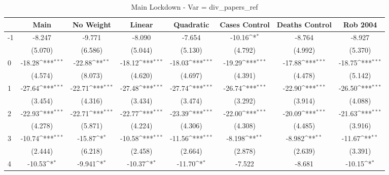 \documentclass{article}
\begin{document}
{
\def\sym#1{\ifmmode^{#1}\else\(^{#1}\)\fi}
\begin{longtable}{l*{7}{c}}
\caption{Main Lockdown - Var = div\_papers\_ref}\\
\hline\hline\endfirsthead\hline\endhead\hline\endfoot\endlastfoot
                &\multicolumn{1}{c}{Main}&\multicolumn{1}{c}{No Weight}&\multicolumn{1}{c}{Linear}&\multicolumn{1}{c}{Quadratic}&\multicolumn{1}{c}{Cases Control}&\multicolumn{1}{c}{Deaths Control}&\multicolumn{1}{c}{Rob 2004}\\
\hline
-1              &   -8.247         &   -9.771         &   -8.090         &   -7.654         &   -10.16\sym{*}  &   -8.764         &   -8.927         \\
                &  (5.070)         &  (6.586)         &  (5.044)         &  (5.130)         &  (4.792)         &  (4.992)         &  (5.370)         \\
0               &   -18.28\sym{***}&   -22.88\sym{**} &   -18.12\sym{***}&   -18.03\sym{***}&   -19.29\sym{***}&   -17.88\sym{***}&   -18.75\sym{***}\\
                &  (4.574)         &  (8.073)         &  (4.620)         &  (4.697)         &  (4.391)         &  (4.478)         &  (5.142)         \\
1               &   -27.64\sym{***}&   -22.71\sym{***}&   -27.48\sym{***}&   -27.74\sym{***}&   -26.74\sym{***}&   -22.90\sym{***}&   -26.50\sym{***}\\
                &  (3.454)         &  (4.316)         &  (3.434)         &  (3.474)         &  (3.292)         &  (3.914)         &  (4.088)         \\
2               &   -22.93\sym{***}&   -22.71\sym{***}&   -22.77\sym{***}&   -23.39\sym{***}&   -22.00\sym{***}&   -20.09\sym{***}&   -21.63\sym{***}\\
                &  (4.278)         &  (5.871)         &  (4.224)         &  (4.306)         &  (4.308)         &  (4.485)         &  (3.916)         \\
3               &   -10.74\sym{***}&   -15.87\sym{*}  &   -10.58\sym{***}&   -11.56\sym{***}&   -8.198\sym{**} &   -8.982\sym{**} &   -11.67\sym{**} \\
                &  (2.444)         &  (6.218)         &  (2.458)         &  (2.664)         &  (2.878)         &  (2.639)         &  (3.391)         \\
4               &   -10.53\sym{*}  &   -9.941\sym{*}  &   -10.37\sym{*}  &   -11.70\sym{*}  &   -7.522         &   -8.681         &   -10.15\sym{*}  \\

\end{longtable}}
\end{document}
